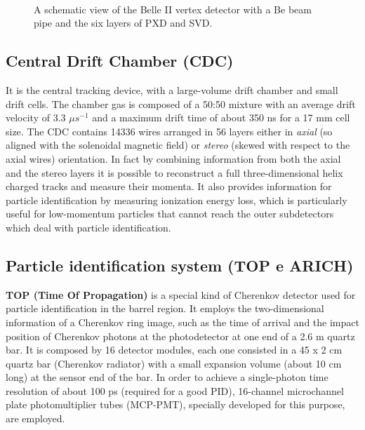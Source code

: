 \begin{figure}[h!]
\centering
{}\quad
{}\\
\caption{A schematic view of the Belle II vertex detector with a Be beam pipe and the six layers of PXD and SVD.}
\label{fig:VXD}
\end{figure}


\subsection{Central Drift Chamber (CDC)}

It is the central tracking device, with a large-volume drift chamber and small drift cells. The chamber gas is composed of a  50:50 mixture with an average drift velocity of 3.3 $\mu s^{-1}$ and a maximum drift time of about 350 ns for a 17 mm cell size.
The CDC contains 14336 wires  arranged in 56 layers either in \textit{axial}  (so aligned with the solenoidal magnetic field) or \textit{stereo} (skewed with respect to the axial wires) orientation. In fact by combining information from both the axial and the stereo layers it is possible to reconstruct a full three-dimensional helix charged tracks and measure their momenta.
It also provides information for particle identification by measuring ionization energy loss, which is particularly useful for low-momentum particles that cannot reach the outer subdetectors which deal with particle identification.


\subsection{Particle identification system (TOP e ARICH)}

\textbf{TOP (Time Of Propagation)} is a special kind of Cherenkov detector used for particle identification in the barrel region. It employs the two-dimensional information of a Cherenkov ring image, such as the time of arrival and the impact position of Cherenkov photons at the photodetector at one end of a 2.6 m quartz bar. It is composed by 16 detector modules, each one consisted in a 45 x 2 cm quartz bar (Cherenkov radiator) with a small expansion volume (about 10 cm long) at the sensor end of the bar. In order to achieve a single-photon time resolution of about 100 ps (required for a good PID), 16-channel microchannel plate photomultiplier tubes (MCP-PMT), specially developed for this purpose, are employed.\\

